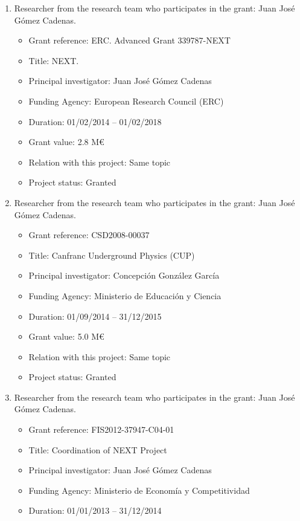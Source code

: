 \documentclass[a4paper,11pt,oneside]{article}
\begin{document}
\begin{enumerate}
\item Researcher from the research team who participates in the grant: Juan Jos\'e G\'omez Cadenas.
  \begin{itemize}
  \item[] Grant reference: ERC. Advanced Grant 339787-NEXT 
  \item[] Title:  NEXT.
  \item[] Principal investigator: Juan Jos\'e G\'omez Cadenas
  \item[] Funding Agency: European Research Council (ERC)
  \item[] Duration: 01/02/2014 -- 01/02/2018
  \item[] Grant value: 2.8 M\euro
  \item[] Relation with this project: Same topic
  \item[] Project status: Granted
  \end{itemize}
\item Researcher from the research team who participates in the grant: Juan Jos\'e G\'omez Cadenas.
  \begin{itemize}
  \item[] Grant reference: CSD2008-00037 
  \item[] Title:  Canfranc Underground Physics (CUP)
  \item[] Principal investigator: Concepci\'on Gonz\'alez Garc\'ia 
  \item[] Funding Agency: Ministerio de Educaci\'on y Ciencia
  \item[] Duration: 01/09/2014 -- 31/12/2015
  \item[] Grant value: 5.0 M\euro
  \item[] Relation with this project: Same topic
  \item[] Project status: Granted
  \end{itemize}
\item Researcher from the research team who participates in the grant: Juan Jos\'e G\'omez Cadenas.
  \begin{itemize}
  \item[] Grant reference: FIS2012-37947-C04-01 
  \item[] Title:  Coordination of NEXT Project
  \item[] Principal investigator: Juan Jos\'e G\'omez Cadenas
  \item[] Funding Agency:  Ministerio de Econom\'ia y Competitividad
  \item[] Duration: 01/01/2013 -- 31/12/2014

\end{itemize}
\end{enumerate}
\end{document}
